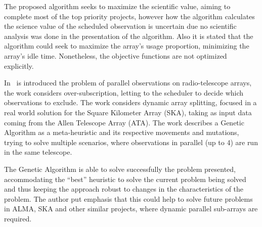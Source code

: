 The proposed algorithm seeks to maximize the scientific value, aiming to complete most of the top priority projects, however how the algorithm calculates the science value of the scheduled observation is uncertain due no scientific analysis was done in the presentation of the algorithm. Also it is stated that the algorithm could seek to maximize the array's usage proportion, minimizing the array's idle time. Nonetheless, the objective functions are not optimized explicitly.

In~\cite{buchner2011dynamic} is introduced the problem of parallel observations on radio-telescope arrays, the work considers over-subscription, letting to the scheduler to decide which observations to exclude. The work considers dynamic array splitting, focused in a real world solution for the Square Kilometer Array (SKA), taking as input data coming from the Allen Telescope Array (ATA). The work describes a Genetic Algorithm as a meta-heuristic and its respective movements and mutations, trying to solve multiple scenarios, where observations in parallel (up to 4) are run in the same telescope.

The Genetic Algorithm is able to solve successfully the problem presented, accommodating the ``best'' heuristic to solve the current problem being solved and thus keeping the approach robust to changes in the characteristics of the problem. The author put emphasis that this could help to solve future problems in ALMA, SKA and other similar projects, where dynamic parallel sub-arrays are required.